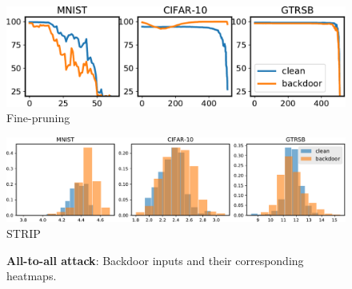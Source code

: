 \begin{figure}[t]
    \centering
    \includegraphics[width=1\textwidth]{figures_supplementary/fine_pruning_all2all_figure.pdf}
    \caption{Fine-pruning}
    \label{fig:fine_pruning_all2all}
\end{figure}

\begin{figure}[t]
    \centering
    \includegraphics[width=1\textwidth]{figures_supplementary/STRIP_all2all_figure.pdf}
    \caption{STRIP}
    \label{fig:STRIP_all2all}
\end{figure}

\begin{figure}[t]
\centering
{}
\hspace{2mm}
    \vspace{-1mm}
\caption{{\bfseries All-to-all attack}: Backdoor inputs and their corresponding heatmaps.}
    \vspace{-4mm}
\label{fig:gradcam_all2all}
\end{figure}

